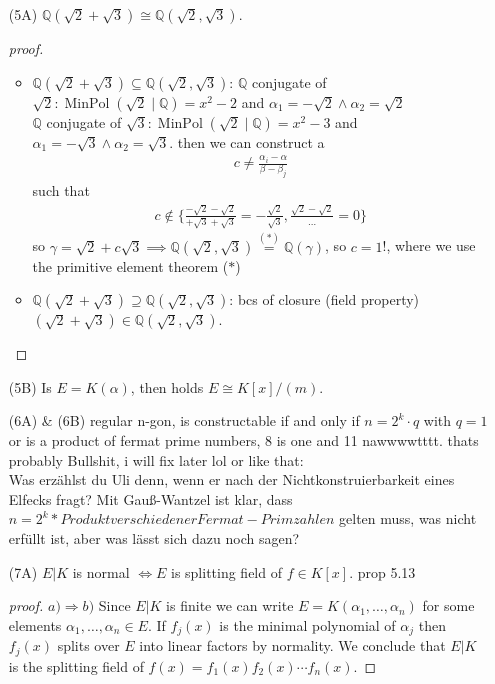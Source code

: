\documentclass[]{scrartcl}
\newcommand{\Q}{\mathbb{Q}}
\newcommand{\<}{\trianglelefteq}
\DeclareMathOperator{\MinPol}{MinPol}
\begin{document}
\begin{itemize}
\begin{proof}[proof]
	\end{proof}
	\item[(5A)] $\Q(\sqrt{2} + \sqrt{3}) \cong \Q(\sqrt{2},\sqrt{3})$.
	\begin{proof}[proof]
		\begin{itemize}
			\item $\Q(\sqrt{2} + \sqrt{3}) \subseteq \Q(\sqrt{2},\sqrt{3})$:
			$\Q$ conjugate of $\sqrt{2}\colon \MinPol(\sqrt{2} \mid \Q) = x^2-2$ and $\alpha_1 = -\sqrt{2} \wedge \alpha_2 = \sqrt{2}$\\
			$\Q$ conjugate of $\sqrt{3}\colon \MinPol(\sqrt{2} \mid \Q) = x^2-3$ and $\alpha_1 = -\sqrt{3} \wedge \alpha_2 = \sqrt{3}$.
			then we can construct a
			\begin{align*}
				c \neq \frac{\alpha_i - \alpha}{\beta - \beta_j}
			\end{align*}
			such that 
			\begin{align*}
				c \notin \{\frac{-\sqrt{2} - \sqrt{2}}{+\sqrt{3} + \sqrt{3}} = -\frac{\sqrt{2}}{\sqrt{3}}, \frac{\sqrt{2} - \sqrt{2}}{\dots} = 0\}
			\end{align*}
			so $\gamma = \sqrt{2} + c\sqrt{3} \implies \Q(\sqrt{2}, \sqrt{3}) \overset{(\ast)}{=} \Q(\gamma)$, so $c = 1$!, where we use the primitive element theorem ($\ast$)
			\item $\Q(\sqrt{2} + \sqrt{3}) \supseteq \Q(\sqrt{2},\sqrt{3})$:
		    bcs of closure (field property) $(\sqrt{2}+\sqrt{3}) \in \mathbb{Q}(\sqrt{2},\sqrt{3})$.
		\end{itemize} 
	\end{proof}
	\item[(5B)] Is $E = K(\alpha)$, then holds $E \cong K[x]/(m)$.
	\item[(6A) \& (6B)] regular n-gon, is constructable if and only if $n = 2^k\cdot q$ with $q = 1$ or is a product of fermat prime numbers, 8 is one and 11 nawwwwtttt. thats probably Bullshit, i will fix later lol or like that: \\
	
	Was erzählst du Uli denn, wenn er nach der Nichtkonstruierbarkeit eines Elfecks fragt? Mit Gauß-Wantzel ist klar, dass\\ $n=2^k*{Produkt verschiedener Fermat-Primzahlen}$ gelten muss, was nicht erfüllt ist, aber was lässt sich dazu noch sagen?
	\item[(7A)] $E|K$ is normal $\Longleftrightarrow E$ is splitting field of $f \in K[x]$. prop 5.13
	\begin{proof}[proof]
		$ a) \Rightarrow b) $ Since $ E|K $ is finite we can write $ E = K(\alpha_1, \dots, \alpha_n) $ for some elements 
		$ \alpha_1, \dots, \alpha_n \in E $. If $ f_j(x) $ is the minimal polynomial of $ \alpha_j $ then $ f_j(x) $ splits 
		over $ E $ into linear factors by normality. We
		conclude that $ E|K $ is the splitting field of $ f(x)
		= f_1(x) f_2(x) \cdots f_n(x) $. 
		

\end{proof}
\end{itemize}
\end{document}
